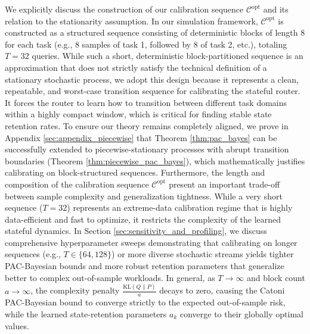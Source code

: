 We explicitly discuss the construction of our calibration sequence $\mathcal{C}^{\text{opt}}$ and its relation to the stationarity assumption. In our simulation framework, $\mathcal{C}^{\text{opt}}$ is constructed as a structured sequence consisting of deterministic blocks of length $8$ for each task (e.g., 8 samples of task 1, followed by 8 of task 2, etc.), totaling $T=32$ queries. While such a short, deterministic block-partitioned sequence is an approximation that does not strictly satisfy the technical definition of a stationary stochastic process, we adopt this design because it represents a clean, repeatable, and worst-case transition sequence for calibrating the stateful router. It forces the router to learn how to transition between different task domains within a highly compact window, which is critical for finding stable state retention rates. To ensure our theory remains completely aligned, we prove in Appendix \ref{sec:appendix_piecewise} that Theorem \ref{thm:pac_bayes} can be successfully extended to piecewise-stationary processes with abrupt transition boundaries (Theorem \ref{thm:piecewise_pac_bayes}), which mathematically justifies calibrating on block-structured sequences. Furthermore, the length and composition of the calibration sequence $\mathcal{C}^{\text{opt}}$ present an important trade-off between sample complexity and generalization tightness. While a very short sequence ($T=32$) represents an extreme-data calibration regime that is highly data-efficient and fast to optimize, it restricts the complexity of the learned stateful dynamics. In Section \ref{sec:sensitivity_and_profiling}, we discuss comprehensive hyperparameter sweeps demonstrating that calibrating on longer sequences (e.g., $T \in \{64, 128\}$) or more diverse stochastic streams yields tighter PAC-Bayesian bounds and more robust retention parameters that generalize better to complex out-of-sample workloads. In general, as $T \to \infty$ and block count $a \to \infty$, the complexity penalty $\frac{\text{KL}(Q \| P)}{a}$ decays to zero, causing the Catoni PAC-Bayesian bound to converge strictly to the expected out-of-sample risk, while the learned state-retention parameters $a_k$ converge to their globally optimal values.

